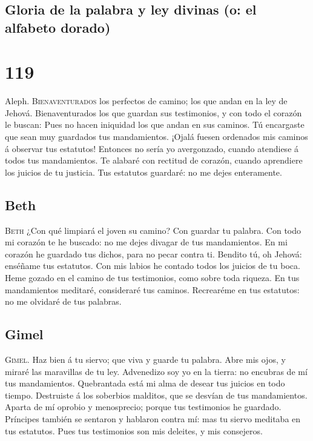 \hypertarget{gloria-de-la-palabra-y-ley-divinas-o-el-alfabeto-dorado}{%
\subsection{Gloria de la palabra y ley divinas (o: el alfabeto
dorado)}\label{gloria-de-la-palabra-y-ley-divinas-o-el-alfabeto-dorado}}

\hypertarget{section-118}{%
\section{119}\label{section-118}}

 Aleph. \textsc{Bienaventurados} los perfectos de camino;
los que andan en la ley de Jehová.  Bienaventurados los
que guardan sus testimonios, y con todo el corazón le buscan:
 Pues no hacen iniquidad los que andan en sus caminos.
 Tú encargaste que sean muy guardados tus mandamientos.
 ¡Ojalá fuesen ordenados mis caminos á observar tus
estatutos!  Entonces no sería yo avergonzado, cuando
atendiese á todos tus mandamientos.  Te alabaré con
rectitud de corazón, cuando aprendiere los juicios de tu justicia.
 Tus estatutos guardaré: no me dejes enteramente.

\hypertarget{beth}{%
\subsection{Beth}\label{beth}}

 \textsc{Beth} ¿Con qué limpiará el joven su camino? Con
guardar tu palabra.  Con todo mi corazón te he buscado:
no me dejes divagar de tus mandamientos.  En mi corazón
he guardado tus dichos, para no pecar contra ti.  Bendito
tú, oh Jehová: enséñame tus estatutos.  Con mis labios he
contado todos los juicios de tu boca.  Heme gozado en el
camino de tus testimonios, como sobre toda riqueza.  En
tus mandamientos meditaré, consideraré tus caminos. 
Recrearéme en tus estatutos: no me olvidaré de tus palabras.

\hypertarget{gimel}{%
\subsection{Gimel}\label{gimel}}

 \textsc{Gimel}. Haz bien á tu siervo; que viva y guarde
tu palabra.  Abre mis ojos, y miraré las maravillas de tu
ley.  Advenedizo soy yo en la tierra: no encubras de mí
tus mandamientos.  Quebrantada está mi alma de desear tus
juicios en todo tiempo.  Destruiste á los soberbios
malditos, que se desvían de tus mandamientos.  Aparta de
mí oprobio y menosprecio; porque tus testimonios he guardado.
 Príncipes también se sentaron y hablaron contra mí: mas
tu siervo meditaba en tus estatutos.  Pues tus
testimonios son mis deleites, y mis consejeros.

